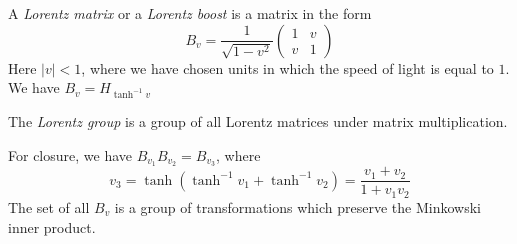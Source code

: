 \documentclass[a4paper]{article}
\begin{document}
      \begin{defi}
        A \emph{Lorentz matrix} or a \emph{Lorentz boost} is a matrix in the form 
        \[
          B_v = \frac{1}{\sqrt{1 - v^2}}
          \begin{pmatrix}
            1 & v\\
            v & 1
          \end{pmatrix}
        \]
        Here $|v| < 1$, where we have chosen units in which the speed of light is equal to $1$. We have $B_v = H_{\tanh^{-1}v}$
      \end{defi}

      \begin{defi}
        The \emph{Lorentz group} is a group of all Lorentz matrices under matrix multiplication.
      \end{defi}
      \note For closure, we have $B_{v_1}B_{v_2} = B_{v_3}$, where
      \[
        v_3 = \tanh(\tanh^{-1} v_1 + \tanh^{-1} v_2) = \frac{v_1 + v_2}{1 + v_1v_2}
      \]
      The set of all $B_v$ is a group of transformations which preserve the Minkowski inner product.
      
\end{document}
